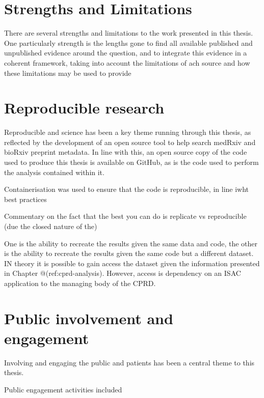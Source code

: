 \documentclass[a4paper, twoside]{templates/ociamthesis}
\begin{document}
\hypertarget{strengths-and-limitations}{%
\section{Strengths and Limitations}\label{strengths-and-limitations}}

There are several strengths and limitations to the work presented in this thesis. One particularly strength is the lengths gone to find all available published and unpublished evidence around the question, and to integrate this evidence in a coherent framework, taking into account the limitations of ach source and how these limitations may be used to provide

\hypertarget{reproducible-research}{%
\section{Reproducible research}\label{reproducible-research}}

Reproducible and science has been a key theme running through this thesis, as reflected by the development of an open source tool to help search medRxiv and bioRxiv preprint metadata. In line with this, an open source copy of the code used to produce this thesis is available on GitHub, as is the code used to perform the analysis contained within it.

Containerisation was used to ensure that the code is reproducible, in line iwht best practices

Commentary on the fact that the best you can do is replicate vs reproducible (due the closed nature of the)

One is the ability to recreate the results given the same data and code, the other is the ability to recreate the results given the same code but a different dataset. IN theory it is possible to gain access the dataset given the information presented in Chapter @(ref:cprd-analysis). However, access is dependency on an ISAC application to the managing body of the CPRD.

\hypertarget{public-involvement-and-engagement}{%
\section{Public involvement and engagement}\label{public-involvement-and-engagement}}

Involving and engaging the public and patients has been a central theme to this thesis.

Public engagement activities included
\end{document}
